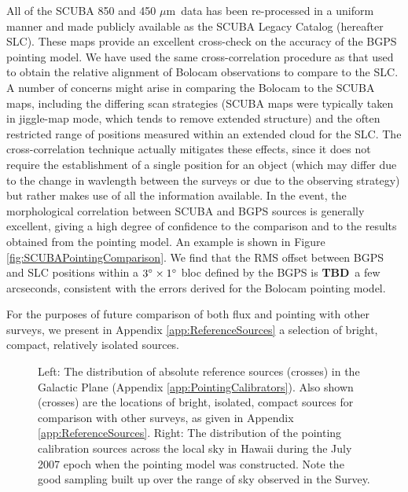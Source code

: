 \documentclass[12pt,preprint]{aastex}
\newcommand{\mum}{\ensuremath{\mu \mathrm{m}}}
\newcommand{\TBD}{{\bf TBD}}
\def\FigureTwo#1#2#3#4#5{
\begin{figure}[htb]
\epsscale{#5}
\plottwo{#1}{#2}
\caption{#3}
\label{#4}
\end{figure}
}
\begin{document}
All of the SCUBA 850 and 450 \mum\ data has been re-processed in a
uniform manner and made publicly available as the SCUBA Legacy Catalog
(hereafter SLC).  These maps provide an excellent cross-check on the
accuracy of the BGPS pointing model.  We have used the same
cross-correlation procedure as that used to obtain the relative
alignment of Bolocam observations to compare to the SLC.  A number of
concerns might arise in comparing the Bolocam to the SCUBA maps,
including the differing scan strategies (SCUBA maps were typically
taken in jiggle-map mode, which tends to remove extended structure)
and the often restricted range of positions measured within an
extended cloud for the SLC.  The cross-correlation technique actually
mitigates these effects, since it does not require the establishment
of a single position for an object (which may differ due to the change
in wavlength between the surveys or due to the observing strategy) but
rather makes use of all the information available.  In the event, the
morphological correlation between SCUBA and BGPS sources is generally
excellent, giving a high degree of confidence to the comparison and to
the results obtained from the pointing model.  An example is shown in
Figure \ref{fig:SCUBAPointingComparison}.  We find that the RMS offset
between BGPS and SLC positions within a $3\mbox{$^\circ$} \times 1\mbox{$^\circ$}$
bloc defined by the BGPS is \TBD\ a few arcseconds, consistent with
the errors derived for the Bolocam pointing model.

For the purposes of future comparison of both flux and pointing with
other surveys, we present in Appendix \ref{app:ReferenceSources} a
selection of bright, compact, relatively isolated sources.


\FigureTwo{plane_astrometry}{pointing_model_skydist}{Left: The
distribution of absolute reference sources (crosses) in the Galactic
Plane (Appendix \ref{app:PointingCalibrators}).  Also shown (crosses)
are the locations of bright, isolated, compact sources for comparison
with other surveys, as given in Appendix \ref{app:ReferenceSources}.
Right: The distribution of the pointing calibration sources across the
local sky in Hawaii during the July 2007 epoch when the pointing model
was constructed.  Note the good sampling built up over the range of
sky observed in the Survey.}{fig:PointingCalibrators}{1.0}
\end{document}
